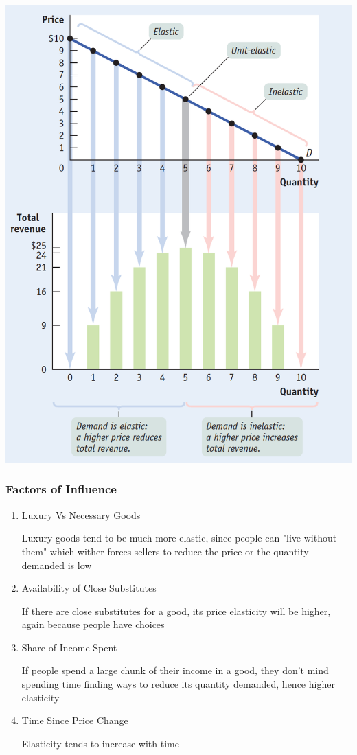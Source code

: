 \documentclass[english,course,draft]{Notes}
\begin{document}

\includegraphics[height=0.8\linewidth, width=0.7\linewidth]{elasticVar}



\subsubsection{Factors of Influence}

\begin{enumerate}
	\item Luxury Vs Necessary Goods
	\par{Luxury goods tend to be much more elastic, since people can "live without them" which wither forces sellers to reduce the price or the quantity demanded is low}
	\item Availability of Close Substitutes
	\par{If there are close substitutes for a good, its price elasticity will be higher, again because people have choices}
	\item Share of Income Spent
	\par{ If people spend a large chunk of their income in a good, they don't mind spending time finding ways to reduce its quantity demanded, hence higher elasticity}
	\item Time Since Price Change
	\par{ Elasticity tends to increase with time}
\end{enumerate}
\end{document}
